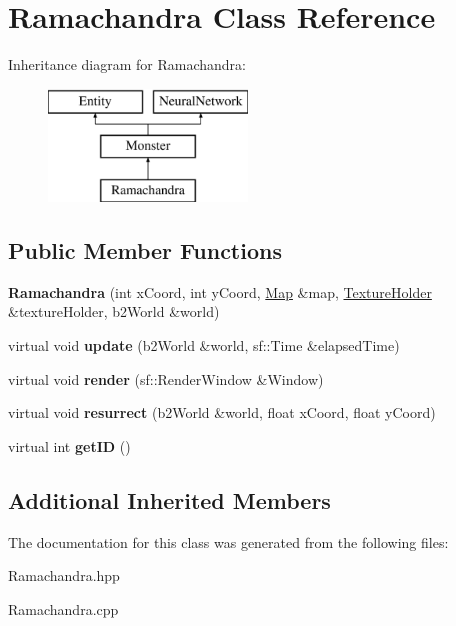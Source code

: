 \hypertarget{class_ramachandra}{\section{Ramachandra Class Reference}
\label{class_ramachandra}
}
Inheritance diagram for Ramachandra\-:\begin{figure}[H]
\begin{center}
\leavevmode
\includegraphics[height=3.000000cm]{class_ramachandra}
\end{center}
\end{figure}
\subsection*{Public Member Functions}
\begin{DoxyCompactItemize}
\item 
\hypertarget{class_ramachandra_a5c1789c5f2e0a5236fcc82a7f20833d2}{{\bfseries Ramachandra} (int x\-Coord, int y\-Coord, \hyperlink{class_map}{Map} \&map, \hyperlink{class_texture_holder}{Texture\-Holder} \&texture\-Holder, b2\-World \&world)}\label{class_ramachandra_a5c1789c5f2e0a5236fcc82a7f20833d2}

\item 
\hypertarget{class_ramachandra_a2f544c9a55f310ec8ccc86c65552f449}{virtual void {\bfseries update} (b2\-World \&world, sf\-::\-Time \&elapsed\-Time)}\label{class_ramachandra_a2f544c9a55f310ec8ccc86c65552f449}

\item 
\hypertarget{class_ramachandra_ace94fd3bbaefa2a068de5b38c9960bf4}{virtual void {\bfseries render} (sf\-::\-Render\-Window \&Window)}\label{class_ramachandra_ace94fd3bbaefa2a068de5b38c9960bf4}

\item 
\hypertarget{class_ramachandra_a31d975d2e07814e3166793cd9cb87c2e}{virtual void {\bfseries resurrect} (b2\-World \&world, float x\-Coord, float y\-Coord)}\label{class_ramachandra_a31d975d2e07814e3166793cd9cb87c2e}

\item 
\hypertarget{class_ramachandra_a09e324917322b4b80a74b098b1a1ae1b}{virtual int {\bfseries get\-I\-D} ()}\label{class_ramachandra_a09e324917322b4b80a74b098b1a1ae1b}

\end{DoxyCompactItemize}
\subsection*{Additional Inherited Members}


The documentation for this class was generated from the following files\-:\begin{DoxyCompactItemize}
\item 
Ramachandra.\-hpp\item 
Ramachandra.\-cpp\end{DoxyCompactItemize}
